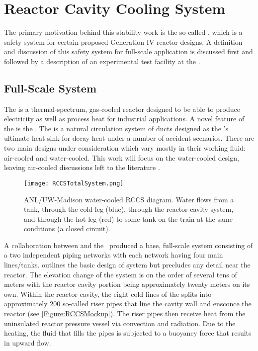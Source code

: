 \section{Reactor Cavity Cooling System}\label{Section:RCCS}
The primary motivation behind this stability work is the so-called , which is a safety system for certain proposed Generation IV reactor designs.
A definition and discussion of this safety system for full-scale application is discussed first and followed by a description of an experimental test facility at the \TheUniversity.

\subsection{Full-Scale System}
The  is a thermal-spectrum, gas-cooled reactor designed to be able to produce electricity as well as process heat for industrial applications.
A novel feature of the  is the .
The  is a natural circulation system of ducts designed as the 's ultimate heat sink for decay heat under a number of accident scenarios.
There are two main designs under consideration which vary mostly in their working fluid: air-cooled and water-cooled.
This work will focus on the water-cooled  design, leaving air-cooled discussions left to the literature \cite{bechtelnationalinc._450_1993,generalatomics_gas_1996}.


\begin{figure}%
\centering
    \caption[ANL/UW-Madison water-cooled RCCS diagram]{   ANL/UW-Madison  water-cooled RCCS diagram.  
                Water flows from a tank, through the cold leg (blue), through the reactor cavity system, and through the hot leg (red) to some tank on the train at the same conditions (a closed circuit).}%
    \label{Figure:RCCSTotalSystem}%
    \texttt{[image: RCCSTotalSystem.png]}%
\end{figure}


A collaboration between  and the \TheUniversity\ produced a base, full-scale  system consisting of a two independent piping networks with each network having four main lines/tanks.
 outlines the basic design of system but precludes any detail near the reactor.
The elevation change of the system is on the order of several tens of meters with the reactor cavity portion being approximately twenty meters on its own.
Within the reactor cavity, the eight cold lines of the  splits into approximately 200 so-called riser pipes that line the cavity wall and ensconce the reactor (see \cref{Figure:RCCSMockup}).
The riser pipes then receive heat from the uninsulated reactor pressure vessel via convection and radiation.
Due to the heating, the fluid that fills the pipes is subjected to a buoyancy force that results in upward flow.

